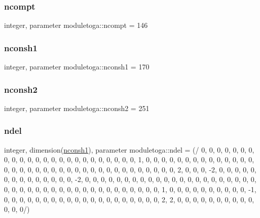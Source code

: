 \mbox{\label{namespacemoduletoga_a151be23f63401a1bb1a76f0a4c30d9ca}} 
\subsubsection{\texorpdfstring{ncompt}{ncompt}}
{\footnotesize\ttfamily integer, parameter moduletoga\+::ncompt = 146\hspace{0.3cm}{\ttfamily [private]}}

\mbox{\label{namespacemoduletoga_a06e41646ba24c11ab2e1b513e5c1760c}} 
\subsubsection{\texorpdfstring{nconsh1}{nconsh1}}
{\footnotesize\ttfamily integer, parameter moduletoga\+::nconsh1 = 170\hspace{0.3cm}{\ttfamily [private]}}

\mbox{\label{namespacemoduletoga_a839ff93f37eef8183b7f13edc4952154}} 
\subsubsection{\texorpdfstring{nconsh2}{nconsh2}}
{\footnotesize\ttfamily integer, parameter moduletoga\+::nconsh2 = 251\hspace{0.3cm}{\ttfamily [private]}}

\mbox{\label{namespacemoduletoga_ac23302539a90cdd733a9f3722c6c4027}} 
\subsubsection{\texorpdfstring{ndel}{ndel}}
{\footnotesize\ttfamily integer, dimension(\mbox{\hyperlink{namespacemoduletoga_a06e41646ba24c11ab2e1b513e5c1760c}{nconsh1}}), parameter moduletoga\+::ndel = (/ 0, 0, 0, 0, 0, 0, 0, 0, 0, 0, 0, 0, 0, 0, 0, 0, 0, 0, 0, 0, 0, 0, 0, 0, 1, 0, 0, 0, 0, 0, 0, 0, 0, 0, 0, 0, 0, 0, 0, 0, 0, 0, 0, 0, 0, 0, 0, 0, 0, 0, 0, 0, 0, 0, 0, 0, 0, 0, 0, 0, 0, 2, 0, 0, 0, -\/2, 0, 0, 0, 0, 0, 0, 0, 0, 0, 0, 0, 0, 0, 0, -\/2, 0, 0, 0, 0, 0, 0, 0, 0, 0, 0, 0, 0, 0, 0, 0, 0, 0, 0, 0, 0, 0, 0, 0, 0, 0, 0, 0, 0, 0, 0, 0, 0, 0, 0, 0, 0, 0, 0, 0, 0, 0, 0, 1, 0, 0, 0, 0, 0, 0, 0, 0, 0, 0, -\/1, 0, 0, 0, 0, 0, 0, 0, 0, 0, 0, 0, 0, 0, 0, 0, 0, 0, 0, 0, 0, 2, 2, 0, 0, 0, 0, 0, 0, 0, 0, 0, 0, 0, 0, 0/)\hspace{0.3cm}{\ttfamily [private]}}

